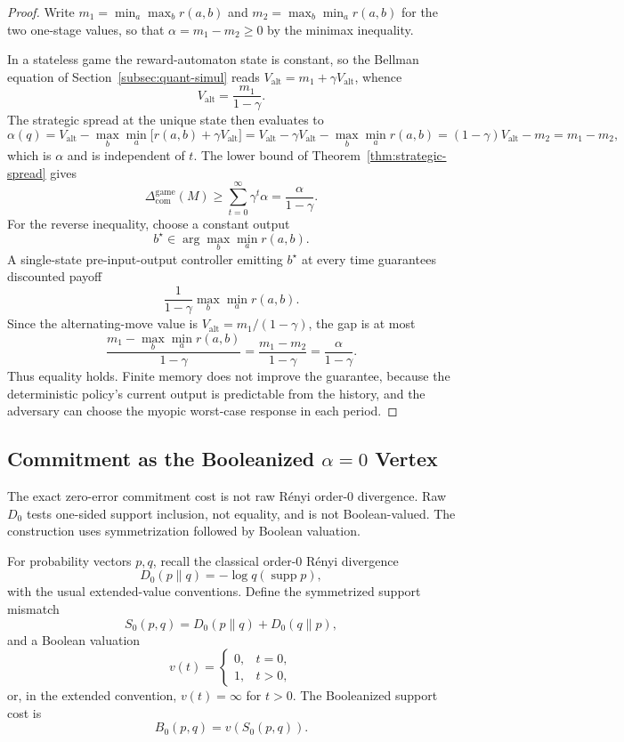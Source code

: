 \documentclass[12pt]{article}
\theoremstyle{definition}
\DeclareMathOperator{\supp}{supp}
\newcommand{\ComGame}{\Delta_{\mathrm{com}}^{\mathrm{game}}}
\newcommand{\Valt}{V_{\mathrm{alt}}}
\begin{document}
\begin{proof}
Write $m_1=\min_a\max_br(a,b)$ and $m_2=\max_b\min_ar(a,b)$ for the two
one-stage values, so that $\alpha=m_1-m_2\ge0$ by the minimax inequality.

In a stateless game the reward-automaton state is constant, so the Bellman
equation of Section~\ref{subsec:quant-simul} reads $\Valt=m_1+\gamma\Valt$,
whence
\[
\Valt=\frac{m_1}{1-\gamma}.
\]
The strategic spread at the unique state then evaluates to
\[
\alpha(q)
=
\Valt-\max_b\min_a\bigl[r(a,b)+\gamma\Valt\bigr]
=
\Valt-\gamma\Valt-\max_b\min_ar(a,b)
=
(1-\gamma)\Valt-m_2
=
m_1-m_2,
\]
which is $\alpha$ and is independent of $t$.  The lower bound of
Theorem~\ref{thm:strategic-spread} gives
\[
\ComGame(M)
\ge
\sum_{t=0}^\infty
\gamma^t\alpha
=
\frac{\alpha}{1-\gamma}.
\]
For the reverse inequality, choose a constant output
\[
b^\star
\in
\arg\max_{b}
\min_a r(a,b).
\]
A single-state pre-input-output controller emitting $b^\star$ at every time
guarantees discounted payoff
\[
\frac{1}{1-\gamma}
\max_b\min_a r(a,b).
\]
Since the alternating-move value is $\Valt=m_1/(1-\gamma)$, the gap is at most
\[
\frac{m_1-\max_b\min_a r(a,b)}{1-\gamma}
=
\frac{m_1-m_2}{1-\gamma}
=
\frac{\alpha}{1-\gamma}.
\]
Thus equality holds.  Finite memory does not improve the guarantee, because
the deterministic policy's current output is predictable from the history, and
the adversary can choose the myopic worst-case response in each period.
\end{proof}

\subsection{Commitment as the Booleanized $\alpha=0$ Vertex}
\label{subsec:commitment-boolean-vertex}

The exact zero-error commitment cost is not raw R\'enyi order-$0$ divergence.
Raw $D_0$ tests one-sided support inclusion, not equality, and is not
Boolean-valued.  The construction uses symmetrization followed by Boolean
valuation.

For probability vectors $p,q$, recall the classical order-$0$ R\'enyi
divergence
\[
D_0(p\|q)
=
-\log q(\supp p),
\]
with the usual extended-value conventions.  Define the symmetrized support
mismatch
\[
S_0(p,q)
=
D_0(p\|q)+D_0(q\|p),
\]
and a Boolean valuation
\[
v(t)=
\begin{cases}
0,&t=0,\\
1,&t>0,
\end{cases}
\]
or, in the extended convention, $v(t)=\infty$ for $t>0$.  The Booleanized
support cost is
\[
B_0(p,q)
=
v(S_0(p,q)).
\]
\end{document}
